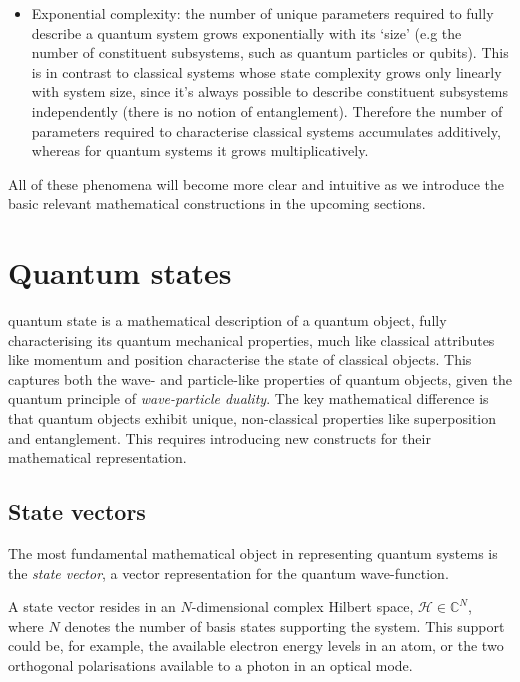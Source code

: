 \begin{itemize}
	\item Exponential complexity: the number of unique parameters required to fully describe a quantum system grows exponentially with its `size' (e.g the number of constituent subsystems, such as quantum particles or qubits). This is in contrast to classical systems whose state complexity grows only linearly with system size, since it's always possible to describe constituent subsystems independently (there is no notion of entanglement). Therefore the number of parameters required to characterise classical systems accumulates additively, whereas for quantum systems it grows multiplicatively.
\end{itemize}

All of these phenomena will become more clear and intuitive as we introduce the basic relevant mathematical constructions in the upcoming sections.

%
%

\section{Quantum states}

 quantum state is a mathematical description of a quantum object, fully characterising its quantum mechanical properties, much like classical attributes like momentum and position characterise the state of classical objects. This captures both the wave- and particle-like properties of quantum objects, given the quantum principle of \textit{wave-particle duality}. The key mathematical difference is that quantum objects exhibit unique, non-classical properties like superposition and entanglement. This requires introducing new constructs for their mathematical representation.

%
%

\subsection{State vectors}

The most fundamental mathematical object in representing quantum systems is the \textit{state vector}, a vector representation for the quantum wave-function.

A state vector resides in an $N$-dimensional complex Hilbert space, \mbox{$\mathcal{H}\in\mathbb{C}^N$}, where $N$ denotes the number of basis states supporting the system. This support could be, for example, the available electron energy levels in an atom, or the two orthogonal polarisations available to a photon in an optical mode.


